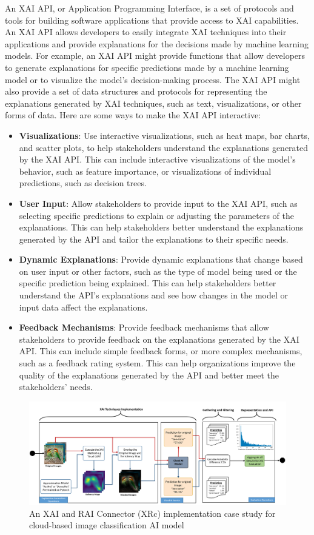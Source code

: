 \documentclass[conference]{IEEEtran}
\begin{document}
An XAI API, or Application Programming Interface, is a set of protocols and tools for building software applications that provide access to XAI capabilities. An XAI API allows developers to easily integrate XAI techniques into their applications and provide explanations for the decisions made by machine learning models. For example, an XAI API might provide functions that allow developers to generate explanations for specific predictions made by a machine learning model or to visualize the model's decision-making process. The XAI API might also provide a set of data structures and protocols for representing the explanations generated by XAI techniques, such as text, visualizations, or other forms of data. Here are some ways to make the XAI API interactive:
\begin{itemize}
	\item \textbf{Visualizations}: Use interactive visualizations, such as heat maps, bar charts, and scatter plots, to help stakeholders understand the explanations generated by the XAI API. This can include interactive visualizations of the model's behavior, such as feature importance, or visualizations of individual predictions, such as decision trees.
	\item \textbf{User Input}: Allow stakeholders to provide input to the XAI API, such as selecting specific predictions to explain or adjusting the parameters of the explanations. This can help stakeholders better understand the explanations generated by the API and tailor the explanations to their specific needs.
	\item \textbf{Dynamic Explanations}: Provide dynamic explanations that change based on user input or other factors, such as the type of model being used or the specific prediction being explained. This can help stakeholders better understand the API's explanations and see how changes in the model or input data affect the explanations.
	\item \textbf{Feedback Mechanisms}: Provide feedback mechanisms that allow stakeholders to provide feedback on the explanations generated by the XAI API. This can include simple feedback forms, or more complex mechanisms, such as a feedback rating system. This can help organizations improve the quality of the explanations generated by the API and better meet the stakeholders' needs.
\end{itemize}

\begin{figure}[htbp!!]
	\centering
	\includegraphics[width=1.0\textwidth]{XAI_MT.png}
	\caption{An XAI and RAI Connector (XRc) implementation case study for cloud-based image classification AI model}
	\label{MIICE}
\end{figure}
\end{document}
